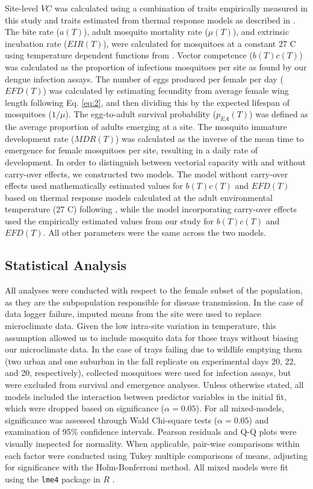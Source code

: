 \documentclass[12pt]{article}
\begin{document}
Site-level $VC$ was calculated using a combination of traits empirically measured in this study and traits estimated from thermal response models as described in \citet{mordecai2017}. The bite rate ($a(T)$), adult mosquito mortality rate ($\mu(T)$), and extrinsic incubation rate ($EIR(T)$), were calculated for mosquitoes at a constant 27 \degree C using temperature dependent functions from \citet{mordecai2017}. Vector competence ($b(T)c(T)$) was calculated as the proportion of infectious mosquitoes per site as found by our dengue infection assays. The number of eggs produced per female per day ($EFD(T)$) was calculated by estimating fecundity from average female wing length following Eq. \ref{eq:2}, and then dividing this by the expected lifespan of mosquitoes ($1/\mu$). The egg-to-adult survival probability ($p_{EA}(T)$) was defined as the average proportion of adults emerging at a site. The mosquito immature development rate ($MDR(T)$) was calculated as the inverse of the mean time to emergence for female mosquitoes per site, resulting in a daily rate of development. In order to distinguish between vectorial capacity with and without carry-over effects, we constructed two models. The model without carry-over effects used mathematically estimated values for $b(T)c(T)$ and $EFD(T)$ based on thermal response models calculated at the adult environmental temperature (27 \degree C) following \citet{mordecai2017}, while the model incorporating carry-over effects used the empirically estimated values from our study for $b(T)c(T)$ and $EFD(T)$. All other parameters were the same across the two models.

\subsection{Statistical Analysis}

All analyses were conducted with respect to the female subset of the population, as they are the subpopulation responsible for disease transmission. In the case of data logger failure, imputed means from the site were used to replace microclimate data. Given the low intra-site variation in temperature, this assumption allowed us to include mosquito data for those trays without biasing our microclimate data. In the case of trays failing due to wildlife emptying them (two urban and one suburban in the fall replicate on experimental days 20, 22, and 20, respectively), collected mosquitoes were used for infection assays, but were excluded from survival and emergence analyses. Unless otherwise stated, all models included the interaction between predictor variables in the initial fit, which were dropped based on significance ($\alpha=0.05$). For all mixed-models, significance was assessed through Wald Chi-square tests ($\alpha=0.05$) and examination of 95\% confidence intervals. Pearson residuals and Q-Q plots were visually inspected for normality. When applicable, pair-wise comparisons within each factor were conducted using Tukey multiple comparisons of means, adjusting for significance with the Holm-Bonferroni method. All mixed models were fit using the \texttt{lme4} \citep{lmePackage} package in $R$ \citep{Rstats2017}.
\end{document}
